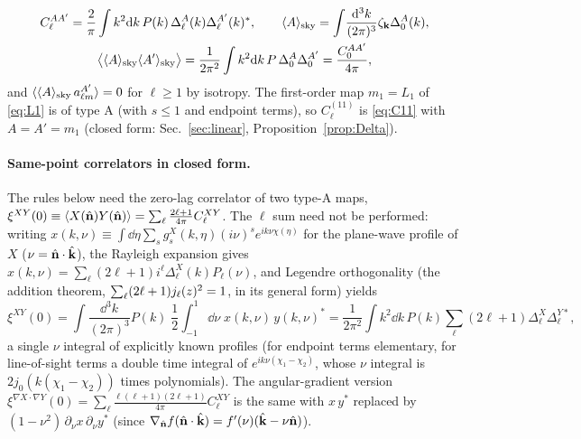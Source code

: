 \begin{equation}
\begin{gathered}C^{AA'}_\ell=\frac2\pi\int k^2\mathrm d k\,P(k)\,\Delta^A_\ell(k)\Delta^{A'}_\ell(k)^*,\qquad
\langle A\rangle_{\rm sky}=\int\!\frac{\mathrm d^3k}{(2\pi)^3}\zeta_{\mathbf k}\Delta^A_0(k),\\
\big\langle\langle A\rangle_{\rm sky}\langle A'\rangle_{\rm sky}\big\rangle=\frac1{2\pi^2}\int k^2\mathrm d k\,P\,\Delta^A_0\Delta^{A'}_0=\frac{C^{AA'}_0}{4\pi},\end{gathered}
\label{eq:C11}
\end{equation}
and $\langle\langle A\rangle_{\rm sky}\,a^{A'}_{\ell m}\rangle=0$ for $\ell\ge1$ by isotropy.  The first-order map $m_1=L_1$ of
\eqref{eq:L1} is of type A (with $s\le1$ and endpoint terms), so $C^{(11)}_\ell$ is \eqref{eq:C11} with
$A=A'=m_1$ (closed form: Sec.~\ref{sec:linear}, Proposition~\ref{prop:Delta}).

\paragraph{Same-point correlators in closed form.}  The rules below need the zero-lag correlator of two type-A maps,
$\xi^{XY}(0)\equiv\langle X(\hat{\mathbf n})Y(\hat{\mathbf n})\rangle=\sum_\ell\frac{2\ell+1}{4\pi}C^{XY}_\ell$.  The $\ell$ sum need not be performed: writing
$x(k,\nu)\equiv\int\dd\eta\sum_sg^X_s(k,\eta)(i\nu)^se^{ik\nu\chi(\eta)}$ for the plane-wave profile of $X$ ($\nu=\hat{\mathbf n}\cdot\hat{\mathbf k}$), the
Rayleigh expansion gives $x(k,\nu)=\sum_\ell(2\ell+1)i^\ell\Delta^X_\ell(k)P_\ell(\nu)$, and Legendre orthogonality (the addition theorem,
$\sum_\ell(2\ell+1)j_\ell(z)^2=1$, in its general form) yields
\begin{equation}
\xi^{XY}(0)=\int\!\frac{\dd^3k}{(2\pi)^3}P(k)\;\frac12\int_{-1}^1\!\dd\nu\;x(k,\nu)\,y(k,\nu)^*
=\frac1{2\pi^2}\int k^2\dd k\,P(k)\sum_\ell(2\ell+1)\Delta^X_\ell\Delta^{Y*}_\ell ,
\label{eq:xi0}
\end{equation}
a single $\nu$ integral of explicitly known profiles (for endpoint terms elementary, for line-of-sight terms a double time integral
of $e^{ik\nu(\chi_1-\chi_2)}$, whose $\nu$ integral is $2j_0(k(\chi_1-\chi_2))$ times polynomials).  The angular-gradient version
$\xi^{\nabla X\cdot\nabla Y}(0)=\sum_\ell\frac{\ell(\ell+1)(2\ell+1)}{4\pi}C^{XY}_\ell$ is the same with $x\,y^*$ replaced by
$(1-\nu^2)\,\partial_\nu x\,\partial_\nu y^*$ (since $\nabla_{\hat{\mathbf n}}f(\hat{\mathbf n}\cdot\hat{\mathbf k})=f'(\nu)(\hat{\mathbf k}-\nu\hat{\mathbf n})$).

